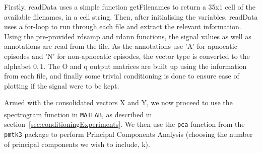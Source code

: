 Firstly, readData uses a simple function getFilenames to return a 35x1 cell of the available filenames, in a cell string. Then, after initialising the variables, readData uses a for-loop to run through each file and extract the relevant information. Using the pre-provided rdsamp and rdann functions, the signal values as well as annotations are read from the file. As the annotations use 'A' for apnoeatic episodes and 'N' for non-apnoeatic episodes, the vector type is converted to the alphabet ${0,1}$. The O and q output matrices are built up using the information from each file, and finally some trivial conditioning is done to ensure ease of plotting if the signal were to be kept.

Armed with the consolidated vectors X and Y, we now proceed to use the spectrogram function in \verb!MATLAB!\textsuperscript{\textregistered}, as described in section~\ref{sec:conditioningExperiments}. We then use the \verb!pca! function from the \verb!pmtk3! package to perform Principal Components Analysis (choosing the number of principal components we wish to include, k). 